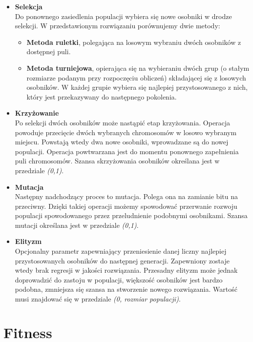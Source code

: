 \documentclass[twoside,twocolumn]{article}
\begin{document}
\begin{itemize}
\item \textbf{Selekcja}\\
Do ponownego zasiedlenia populacji wybiera się nowe osobniki w drodze selekcji. W przedstawionym rozwiązaniu porównujemy dwie metody:
	\begin{itemize}
		\item \textbf{Metoda ruletki}, polegająca na losowym wybraniu dwóch osobników z dostępnej puli.
		\item \textbf{Metoda turniejowa}, opierająca się na wybieraniu dwóch grup (o stałym rozmiarze podanym przy rozpoczęciu obliczeń) składającej się z losowych osobników. W każdej grupie wybiera się najlepiej przystosowanego z nich, który jest przekazywany do następnego pokolenia.
	\end{itemize}
\item \textbf{Krzyżowanie}\\
Po selekcji dwóch osobników może nastąpić etap krzyżowania. Operacja powoduje przecięcie dwóch wybranych chromosomów w losowo wybranym miejscu. Powstają wtedy dwa nowe osobniki, wprowadzane są do nowej populacji. Operacja powtwarzana jest do momentu ponownego zapełnienia puli chromosomów. Szansa skrzyżowania osobników określana jest w przedziale \textit{(0,1)}.
\item \textbf{Mutacja}\\
Następny nadchodzący proces to mutacja. Polega ona na zamianie bitu na przeciwny. Dzięki takiej operacji możemy spowodować przerwanie rozwoju populacji spowodowanego przez przeludnienie podobnymi osobnikami. Szansa mutacji określana jest w przedziale \textit{(0,1)}.
\item \textbf{Elityzm}\\
Opcjonalny parametr zapewniający przeniesienie danej liczny najlepiej przystosowanych osobników do następnej generacji. Zapewniony zostaje wtedy brak regresji w jakości rozwiązania. Przesadny elityzm może jednak doprowadzić do zastoju w populacji, większość osobników jest bardzo podobna, zmniejsza się szansa na stworzenie nowego rozwiązania. Wartość musi znajdować się w przedziale \textit{(0, rozmiar populacji)}.
\end{itemize}

\section{Fitness}
\end{document}
